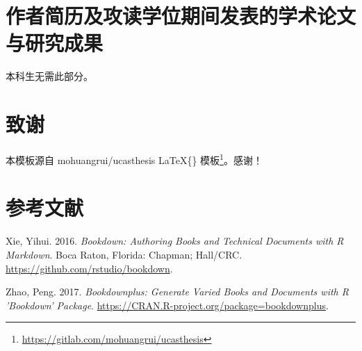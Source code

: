 \documentclass[doublesided]{Style/ucasthesis}%
\begin{document}
\hypertarget{section-10}{%
\chapter{作者简历及攻读学位期间发表的学术论文与研究成果}\label{section-10}}

本科生无需此部分。

\hypertarget{section-11}{%
\chapter{致谢}\label{section-11}}

本模板源自 mohuangrui/ucasthesis \LaTeX\{\} 模板\footnote{\url{https://gitlab.com/mohuangrui/ucasthesis}}。感谢！

\hypertarget{section-12}{%
\chapter{参考文献}\label{section-12}}



\hypertarget{refs}{}
\leavevmode\hypertarget{ref-R-bookdown}{}%
Xie, Yihui. 2016. \emph{Bookdown: Authoring Books and Technical Documents with R Markdown}. Boca Raton, Florida: Chapman; Hall/CRC. \url{https://github.com/rstudio/bookdown}.

\leavevmode\hypertarget{ref-R-bookdownplus}{}%
Zhao, Peng. 2017. \emph{Bookdownplus: Generate Varied Books and Documents with R 'Bookdown' Package}. \url{https://CRAN.R-project.org/package=bookdownplus}.
\end{document}
